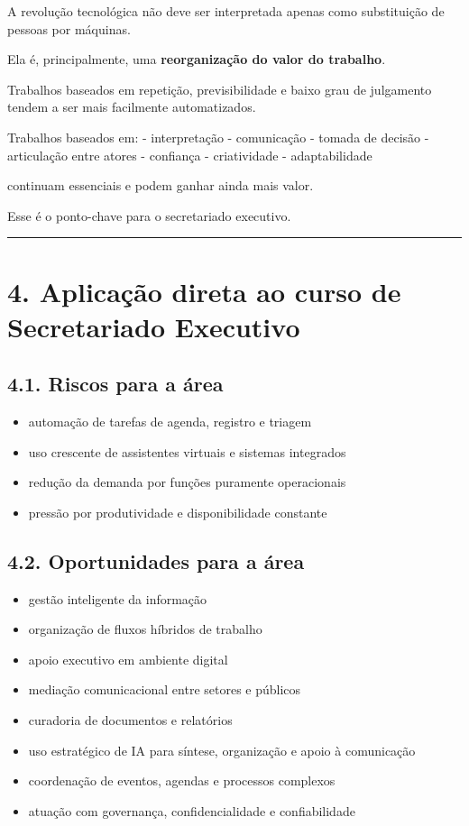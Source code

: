 \documentclass[
]{book}
\providecommand{\tightlist}{%
  \setlength{\itemsep}{0pt}\setlength{\parskip}{0pt}}
\theoremstyle{definition}
\theoremstyle{definition}
\theoremstyle{definition}
\theoremstyle{definition}
\theoremstyle{remark}
\begin{document}
A revolução tecnológica não deve ser interpretada apenas como substituição de pessoas por máquinas.

Ela é, principalmente, uma \textbf{reorganização do valor do trabalho}.

Trabalhos baseados em repetição, previsibilidade e baixo grau de julgamento tendem a ser mais facilmente automatizados.

Trabalhos baseados em:
- interpretação
- comunicação
- tomada de decisão
- articulação entre atores
- confiança
- criatividade
- adaptabilidade

continuam essenciais e podem ganhar ainda mais valor.

Esse é o ponto-chave para o secretariado executivo.

\begin{center}\rule{0.5\linewidth}{0.5pt}\end{center}

\chapter{4. Aplicação direta ao curso de Secretariado Executivo}\label{aplicauxe7uxe3o-direta-ao-curso-de-secretariado-executivo}

\section{4.1. Riscos para a área}\label{riscos-para-a-uxe1rea}

\begin{itemize}
\tightlist
\item
  automação de tarefas de agenda, registro e triagem
\item
  uso crescente de assistentes virtuais e sistemas integrados
\item
  redução da demanda por funções puramente operacionais
\item
  pressão por produtividade e disponibilidade constante
\end{itemize}

\section{4.2. Oportunidades para a área}\label{oportunidades-para-a-uxe1rea}

\begin{itemize}
\tightlist
\item
  gestão inteligente da informação
\item
  organização de fluxos híbridos de trabalho
\item
  apoio executivo em ambiente digital
\item
  mediação comunicacional entre setores e públicos
\item
  curadoria de documentos e relatórios
\item
  uso estratégico de IA para síntese, organização e apoio à comunicação
\item
  coordenação de eventos, agendas e processos complexos
\item
  atuação com governança, confidencialidade e confiabilidade
\end{itemize}
\end{document}
